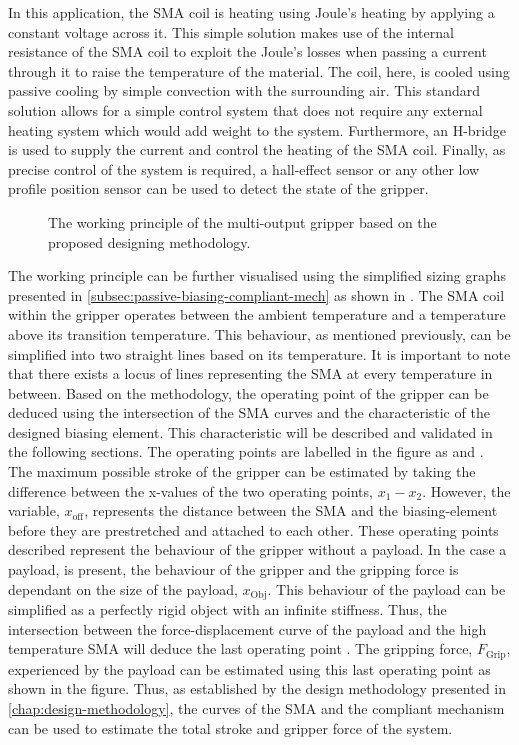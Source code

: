 In this application, the SMA coil is heating using Joule's heating by applying a constant voltage across it. This simple solution makes use of the internal resistance of the SMA coil to exploit the Joule's losses when passing a current through it to raise the temperature of the material. The coil, here, is cooled using passive cooling by simple convection with the surrounding air. This standard solution allows for a simple control system that does not require any external heating system which would add weight to the system. Furthermore, an H-bridge is used to supply the current and control the heating of the SMA coil. Finally, as precise control of the system is required, a hall-effect sensor or any other low profile position sensor can be used to detect the state of the gripper.

\begin{figure}[hbt!] %
  \centering
  \resizebox{0.6\textwidth}{!}{}
  \caption{The working principle of the multi-output gripper based on the proposed designing methodology.}
  \label{fig:mandrel-gripperwp}
\end{figure}

The working principle can be further visualised using the simplified sizing graphs presented in \cref{subsec:passive-biasing-compliant-mech} as shown in \todocite. The SMA coil within the gripper operates between the ambient temperature and a temperature above its transition temperature. This behaviour, as mentioned previously, can be simplified into two straight lines based on its temperature. It is important to note that there exists a locus of lines representing the SMA at every temperature in between. Based on the methodology, the operating point of the gripper can be deduced using the intersection of the SMA curves and the characteristic of the designed biasing element. This characteristic will be described and validated in the following sections. The operating points are labelled in the figure as  and . The maximum possible stroke of the gripper can be estimated by taking the difference between the x-values of the two operating points, $x_1-x_2$. However, the variable, $x_\mathrm{off}$, represents the distance between the SMA and the biasing-element before they are prestretched and attached to each other. These operating points described represent the behaviour of the gripper without a payload. In the case a payload, is present, the behaviour of the gripper and the gripping force is dependant on the size of the payload, $x_\mathrm{Obj}$. This behaviour of the payload can be simplified as a perfectly rigid object with an infinite stiffness. Thus, the intersection between the force-displacement curve of the payload and the high temperature SMA will deduce the last operating point . The gripping force, $F_\mathrm{Grip}$, experienced by the payload can be estimated using this last operating point as shown in the figure. Thus, as established by the design methodology presented in \cref{chap:design-methodology}, the curves of the SMA and the compliant mechanism can be used to estimate the total stroke and gripper force of the system.
